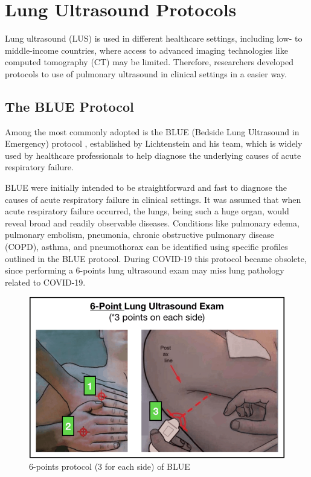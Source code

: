 \newpage
\chapter{Lung Ultrasound Protocols}
Lung ultrasound (LUS) is used in different healthcare settings, including low- to middle-income countries, where access to advanced imaging technologies like computed tomography (CT) may be limited. Therefore, researchers developed protocols to use of pulmonary ultrasound in clinical settings in a easier way. 

\section{The BLUE Protocol}
Among the most commonly adopted is the BLUE (Bedside Lung Ultrasound in Emergency) protocol \cite{lichtenstein2008blue}, established by Lichtenstein and his team, which is widely used by healthcare professionals to help diagnose the underlying causes of acute respiratory failure.

BLUE were initially intended to be straightforward and fast to diagnose the causes of acute respiratory failure in clinical settings. It was assumed that when acute respiratory failure occurred, the lungs, being such a huge organ, would reveal broad and readily observable diseases. Conditions like pulmonary edema, pulmonary embolism, pneumonia, chronic obstructive pulmonary disease (COPD), asthma, and pneumothorax can be identified using specific profiles outlined in the BLUE protocol. During COVID-19 this protocol became obsolete, since performing a 6-points lung ultrasound exam may miss lung pathology related to COVID-19.
\begin{figure}[h]
    \centering
    \includegraphics[width=0.5\linewidth]{images/us_protocols/6-points-protocol.png}
    \caption{6-points protocol (3 for each side) of BLUE}
    \label{fig:enter-label}
\end{figure}
